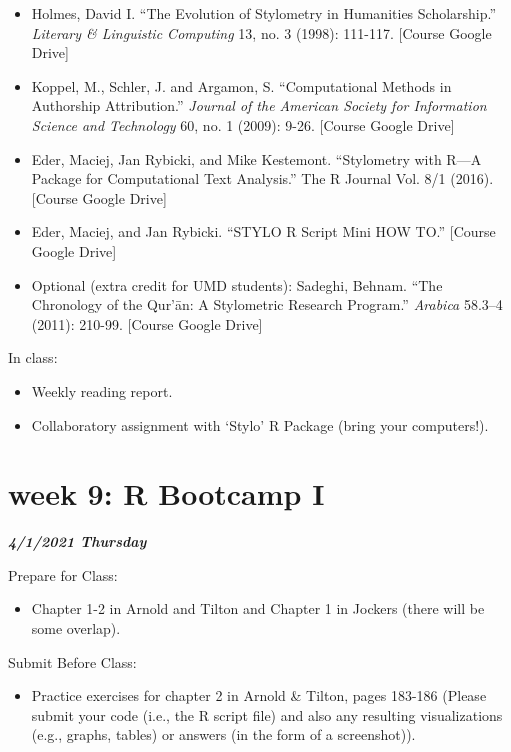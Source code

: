 \documentclass[
]{book}
\providecommand{\tightlist}{%
  \setlength{\itemsep}{0pt}\setlength{\parskip}{0pt}}
\begin{document}
\begin{itemize}
\tightlist
\item
  Holmes, David I. ``The Evolution of Stylometry in Humanities Scholarship.'' \emph{Literary \& Linguistic Computing} 13, no. 3 (1998): 111-117. {[}Course Google Drive{]}
\item
  Koppel, M., Schler, J. and Argamon, S. ``Computational Methods in Authorship Attribution.'' \emph{Journal of the American Society for Information Science and Technology} 60, no. 1 (2009): 9-26. {[}Course Google Drive{]}\\
\item
  Eder, Maciej, Jan Rybicki, and Mike Kestemont. ``Stylometry with R---A Package for Computational Text Analysis.'' The R Journal Vol. 8/1 (2016). {[}Course Google Drive{]}\\
\item
  Eder, Maciej, and Jan Rybicki. ``STYLO R Script Mini HOW TO.'' {[}Course Google Drive{]}\\
\item
  Optional (extra credit for UMD students): Sadeghi, Behnam. ``The Chronology of the Qur'ān: A Stylometric Research Program.'' \emph{Arabica} 58.3--4 (2011): 210-99. {[}Course Google Drive{]}
\end{itemize}

In class:

\begin{itemize}
\tightlist
\item
  Weekly reading report.
\item
  Collaboratory assignment with `Stylo' R Package (bring your computers!).
\end{itemize}

\hypertarget{week-9-r-bootcamp-i-1}{%
\chapter{week 9: R Bootcamp I}\label{week-9-r-bootcamp-i-1}}

\textbf{\emph{4/1/2021 Thursday}}

Prepare for Class:

\begin{itemize}
\tightlist
\item
  Chapter 1-2 in Arnold and Tilton and Chapter 1 in Jockers (there will be some overlap).
\end{itemize}

Submit Before Class:

\begin{itemize}
\tightlist
\item
  Practice exercises for chapter 2 in Arnold \& Tilton, pages 183-186 (Please submit your code (i.e., the R script file) and also any resulting visualizations (e.g., graphs, tables) or answers (in the form of a screenshot)).
\end{itemize}
\end{document}
